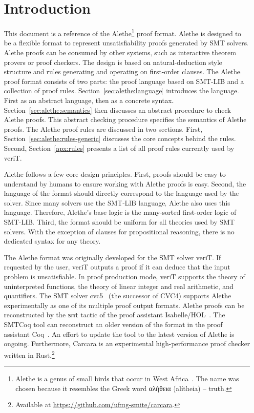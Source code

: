 \documentclass{scrartcl}
\newcommand\smtlib{SMT-LIB}
\newcommand\tool[1]{\textsf{#1}}
\newcommand\tactic[1]{\texttt{#1}}
\newcommand\verit{\tool{veriT}}
\newcommand\cvcfive{\tool{cvc5}}
\newcommand\cvcfour{\tool{CVC4}}
\newcommand\isabelle{\tool{Isabelle/HOL}}
\theoremstyle{definition}
\begin{document}
\section{Introduction}
This document is a reference of the
Alethe\footnote{Alethe is a genus of small birds that occur in West Africa~\cite{wp:alethe}.
The name was chosen because it
resembles the Greek word {αλήθεια} (alítheia) -- truth.} proof format.  Alethe is
designed to be a flexible format to represent unsatisfiability proofs
generated by SMT solvers.  Alethe proofs can be consumed by other systems,
such as interactive theorem provers or proof checkers.  The design
is based on natural-deduction style structure
and rules generating and operating on first-order clauses.
%
The Alethe proof format consists of two parts: the proof
language based on {\smtlib} and a collection of proof rules.
Section~\ref{sec:alethe:language} introduces the language.  First as an
abstract language, then as a concrete syntax.
Section~\ref{sec:alethe:semantics} then discusses an abstract procedure
to check Alethe proofs.  This abstract checking procedure specifies
the semantics of Alethe proofs.
%
The Alethe proof rules are discussed in two sections.
First, Section~\ref{sec:alethe:rules-generic} discusses the core
concepts behind the rules.
%
Second, Section~\ref{apx:rules} presents a list of
all proof rules currently used by {\verit}.

Alethe follows a few core design principles.  First, proofs should
be easy to understand by humans to ensure working with Alethe proofs
is easy.  Second, the language of the format should directly
correspond to the language used by the solver.  Since many solvers use the
{\smtlib} language, Alethe also uses this language.
Therefore, Alethe's base logic is the many-sorted first-order logic of {\smtlib}.
Third, the format should
be uniform for all theories used by SMT solvers.  With the exception
of clauses for propositional reasoning, there is no dedicated syntax for
any theory.

The Alethe format was originally developed for the SMT solver {\verit}. If requested
by the user, {\verit} outputs a proof if it can deduce that the input problem is
unsatisfiable. In proof production mode, {\verit} supports the theory of
uninterpreted functions, the theory of linear integer and real arithmetic, and
quantifiers.
The SMT solver {\cvcfive}~\cite{barbosa-2022} (the successor of
{\cvcfour}) supports Alethe experimentally as one of its multiple proof
output formats.
%
Alethe proofs can be reconstructed by the \tactic{smt} tactic of
the proof assistant {\isabelle}~\cite{fleury-2019,schurr-2021}.
The \tool{SMTCoq} tool can
reconstruct an older version of the format in the
proof assistant \tool{Coq}~\cite{SMTCoq}.  An effort to update the
tool to the latest version of Alethe is ongoing.
%
Furthermore, \tool{Carcara} is an experimental
high-performance proof checker written in Rust.\footnote{Available at
\url{https://github.com/ufmg-smite/carcara}.}
\end{document}
